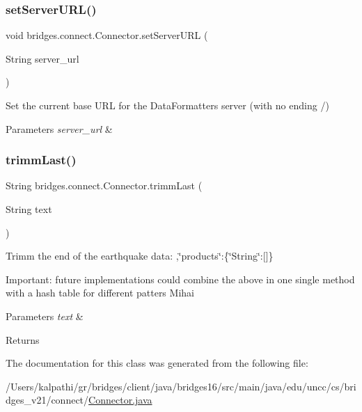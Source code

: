 \subsubsection{\texorpdfstring{set\+Server\+U\+R\+L()}{setServerURL()}}
{\footnotesize\ttfamily void bridges.\+connect.\+Connector.\+set\+Server\+U\+RL (\begin{DoxyParamCaption}\item[{String}]{server\+\_\+url }\end{DoxyParamCaption})}

Set the current base U\+RL for the Data\+Formatters server (with no ending /) 
\begin{DoxyParams}{Parameters}
{\em server\+\_\+url} & \\
\hline
\end{DoxyParams}
\hypertarget{classbridges_1_1connect_1_1_connector_ac0dca0bd99b6abbbd8a77874a95e6d49}{}\label{classbridges_1_1connect_1_1_connector_ac0dca0bd99b6abbbd8a77874a95e6d49} 
\subsubsection{\texorpdfstring{trimm\+Last()}{trimmLast()}}
{\footnotesize\ttfamily String bridges.\+connect.\+Connector.\+trimm\+Last (\begin{DoxyParamCaption}\item[{String}]{text }\end{DoxyParamCaption})}

Trimm the end of the earthquake data\+: ,\char`\"{}products\char`\"{}\+:\{\char`\"{}\+String\char`\"{}\+:\mbox{[}\mbox{]}\}

Important\+: future implementations could combine the above in one single method with a hash table for different patters Mihai 
\begin{DoxyParams}{Parameters}
{\em text} & \\
\hline
\end{DoxyParams}
\begin{DoxyReturn}{Returns}

\end{DoxyReturn}


The documentation for this class was generated from the following file\+:\begin{DoxyCompactItemize}
\item 
/\+Users/kalpathi/gr/bridges/client/java/bridges16/src/main/java/edu/uncc/cs/bridges\+\_\+v21/connect/\hyperlink{_connector_8java}{Connector.\+java}\end{DoxyCompactItemize}
